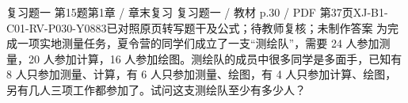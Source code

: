 \par\noindent\begin{minipage}{\linewidth}
\begin{bankitem}{复习题一 第15题}{第1章 / 章末复习 复习题一 / 教材 p.30 / PDF 第37页}{XJ-B1-C01-RV-P030-Y0883}{已对照原页转写题干及公式；待教师复核；未制作答案}
为完成一项实地测量任务，夏令营的同学们成立了一支“测绘队”，需要 24 人参加测量，20 人参加计算，16 人参加绘图。测绘队的成员中很多同学是多面手，已知有 8 人只参加测量、计算，有 6 人只参加测量、绘图，有 4 人只参加计算、绘图，另有几人三项工作都参加了。试问这支测绘队至少有多少人？
\end{bankitem}
\end{minipage}\par\medskip

